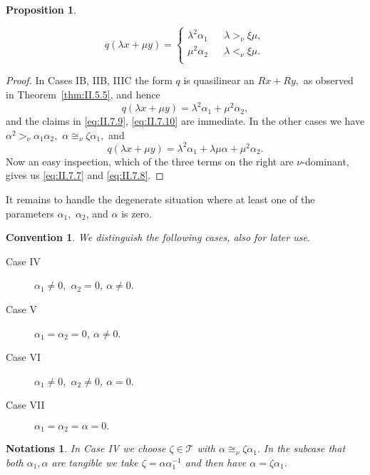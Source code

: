 \documentclass [12pt,a4paper,reqno]{amsart}
\newtheorem{prop}[thm]{Proposition}
\newtheorem{convention}[thm]{Convention}
\newtheorem{notations}[thm]{Notations}
\begin{document}
\begin{prop}
\begin{enumerate} {{}}
  \begin{equation}\label{eq:II.7.10}
   q({\lambda} x + \mu y ) = \left\{
    \begin{array}{lll}
      {\lambda}^2 {\alpha}_1 & &  {\lambda} {>_\nu} {\xi} \mu, \\[1mm]
       \mu^2 {\alpha}_2 &  & {\lambda} {<_\nu} {\xi} \mu. \\
    \end{array}
  \right.
  \end{equation} {\vskip 1.5mm \noindent}
\end{enumerate}

\end{prop}

\begin{proof} In  Cases  {{{I}}{{B}}},  {{{II}}{{B}}},  {{{III}}{{C}}} the form $q$ is quasilinear  an $Rx + Ry,$ as observed in Theorem~\ref{thm:II.5.5}, and hence
$$ q({\lambda} x + \mu y) = {\lambda}^2 {\alpha}_1 + \mu^2 {\alpha}_2,$$
and the claims in \eqref{eq:II.7.9}, \eqref{eq:II.7.10} are immediate. In the other cases we have ${\alpha}^2 {>_\nu} {\alpha}_1 {\alpha}_2,$ ${\alpha} {\cong_\nu} {\zeta} {\alpha}_1,$ and
$$ q({\lambda} x + \mu y ) = {\lambda}^2 {\alpha}_1 + {\lambda} \mu {\alpha} + \mu^2 {\alpha}_2.$$
Now an easy inspection, which of the three terms on the right are $\nu$-dominant, gives us \eqref{eq:II.7.7} and  \eqref{eq:II.7.8}.
\end{proof}

It remains to handle the degenerate situation where at least one of the parameters ${\alpha}_1,$ ${\alpha}_2$, and ${\alpha}$ is zero.
\begin{convention}\label{conv:II.7.6} We distinguish the following cases, also for later use.
  \begin{description}
   \item[Case IV] ${\alpha}_1 \neq 0,$ ${\alpha}_2 = 0$, ${\alpha} \neq  0.$ {\vskip 1.5mm \noindent}
  \item[Case V] ${\alpha}_1= {\alpha}_2 = 0$, ${\alpha} \neq 0.$ {\vskip 1.5mm \noindent}
  \item[Case VI] ${\alpha}_1 \neq  0,$ ${\alpha}_2 \neq 0$, ${\alpha} = 0.$ {\vskip 1.5mm \noindent}
  \item[Case VII] ${\alpha}_1  = {\alpha}_2 =  {\alpha} = 0.$ {\vskip 1.5mm \noindent}
  \end{description}
\end{convention}

\begin{notations}\label{notat:II.7.6}
  In Case IV we choose ${\zeta} \in {\mathcal T}$ with ${\alpha} {\cong_\nu} {\zeta} {\alpha}_1.$ In the subcase that both ${\alpha}_1, {\alpha} $ are tangible we take ${\zeta} = {\alpha} {\alpha}_1^{-1}$ and then have ${\alpha} = {\zeta} {\alpha}_1.$
\end{notations}
\end{document}
